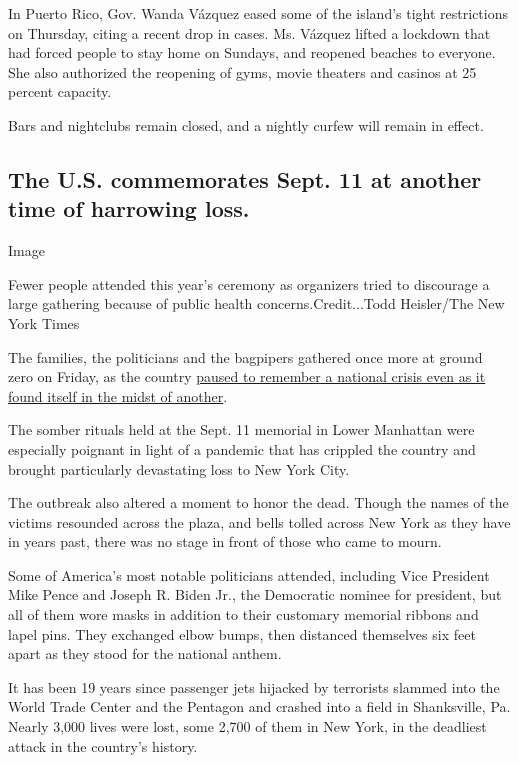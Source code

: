 In Puerto Rico, Gov. Wanda Vázquez eased some of the island's tight
restrictions on Thursday, citing a recent drop in cases. Ms. Vázquez
lifted a lockdown that had forced people to stay home on Sundays, and
reopened beaches to everyone. She also authorized the reopening of gyms,
movie theaters and casinos at 25 percent capacity.

Bars and nightclubs remain closed, and a nightly curfew will remain in
effect.

\hypertarget{the-us-commemorates-sept-11-at-another-time-of-harrowing-loss}{%
\subsection{The U.S. commemorates Sept. 11 at another time of harrowing
loss.}\label{the-us-commemorates-sept-11-at-another-time-of-harrowing-loss}}

Image

Fewer people attended this year's ceremony as organizers tried to
discourage a large gathering because of public health
concerns.Credit...Todd Heisler/The New York Times

The families, the politicians and the bagpipers gathered once more at
ground zero on Friday, as the country
\href{https://www.nytimes3xbfgragh.onion/2020/09/11/nyregion/9-11-ceremony-September-11th.html}{paused
to remember a national crisis even as it found itself in the midst of
another}.

The somber rituals held at the Sept. 11 memorial in Lower Manhattan were
especially poignant in light of a pandemic that has crippled the country
and brought particularly devastating loss to New York City.

The outbreak also altered a moment to honor the dead. Though the names
of the victims resounded across the plaza, and bells tolled across New
York as they have in years past, there was no stage in front of those
who came to mourn.

Some of America's most notable politicians attended, including Vice
President Mike Pence and Joseph R. Biden Jr., the Democratic nominee for
president, but all of them wore masks in addition to their customary
memorial ribbons and lapel pins. They exchanged elbow bumps, then
distanced themselves six feet apart as they stood for the national
anthem.

It has been 19 years since passenger jets hijacked by terrorists slammed
into the World Trade Center and the Pentagon and crashed into a field in
Shanksville, Pa. Nearly 3,000 lives were lost, some 2,700 of them in New
York, in the deadliest attack in the country's history.

